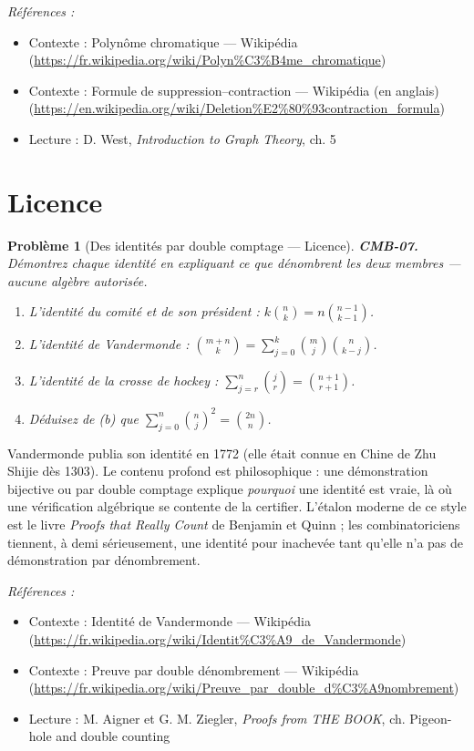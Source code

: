 \documentclass[11pt]{article}
\newtheorem{problem}{Problème}
\newenvironment{refs}{\par\small\noindent\emph{Références :}\begin{itemize}\setlength\itemsep{0pt}}{\end{itemize}\normalsize}
\begin{document}
\begin{refs}
\item Contexte : Polynôme chromatique --- Wikipédia (\url{https://fr.wikipedia.org/wiki/Polyn%C3%B4me_chromatique})
\item Contexte : Formule de suppression--contraction --- Wikipédia (en anglais) (\url{https://en.wikipedia.org/wiki/Deletion%E2%80%93contraction_formula})
\item Lecture : D. West, \textit{Introduction to Graph Theory}, ch. 5
\end{refs}

\bigskip


\section*{Licence}

\begin{problem}[{Des identités par double comptage --- Licence}]
\textbf{CMB-07.} Démontrez chaque identité en expliquant ce que dénombrent les deux membres ---
aucune algèbre autorisée.
\begin{enumerate}
\item[(a)] L'identité du comité et de son président : $ k\binom{n}{k} = n\binom{n-1}{k-1} $.
\item[(b)] L'identité de Vandermonde :
$ \binom{m+n}{k} = \sum_{j=0}^{k} \binom{m}{j}\binom{n}{k-j} $.
\item[(c)] L'identité de la crosse de hockey :
$ \sum_{j=r}^{n} \binom{j}{r} = \binom{n+1}{r+1} $.
\item[(d)] Déduisez de (b) que $ \sum_{j=0}^{n} \binom{n}{j}^2 = \binom{2n}{n} $.
\end{enumerate}

\end{problem}

\noindent Vandermonde publia son identité en 1772 (elle était connue en Chine de Zhu Shijie
dès 1303). Le contenu profond est philosophique : une démonstration bijective ou par double
comptage explique \textit{pourquoi} une identité est vraie, là où une vérification algébrique se
contente de la certifier. L'étalon moderne de ce style est le livre \textit{Proofs that Really Count}
de Benjamin et Quinn ; les combinatoriciens tiennent, à demi sérieusement, une identité pour
inachevée tant qu'elle n'a pas de démonstration par dénombrement.

\begin{refs}
\item Contexte : Identité de Vandermonde --- Wikipédia (\url{https://fr.wikipedia.org/wiki/Identit%C3%A9_de_Vandermonde})
\item Contexte : Preuve par double dénombrement --- Wikipédia (\url{https://fr.wikipedia.org/wiki/Preuve_par_double_d%C3%A9nombrement})
\item Lecture : M. Aigner et G. M. Ziegler, \textit{Proofs from THE BOOK}, ch. \og{} Pigeon-hole and double counting \fg{}
\end{refs}
\end{document}
